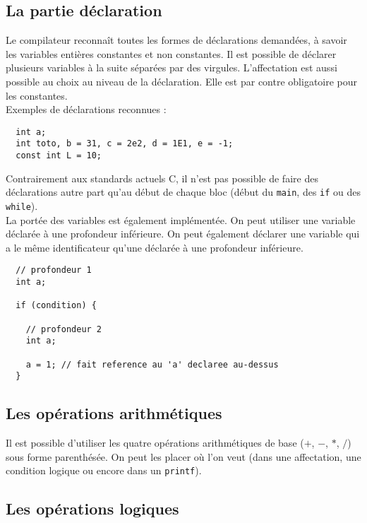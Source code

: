 \subsection{La partie déclaration}

Le compilateur reconnaît toutes les formes de déclarations demandées, à savoir les variables entières constantes et non constantes. Il est possible de déclarer plusieurs variables à la suite séparées par des virgules. L’affectation est aussi possible au choix au niveau de la déclaration. Elle est par contre obligatoire pour les constantes.\\

Exemples de déclarations reconnues :
\begin{verbatim}
  int a;
  int toto, b = 31, c = 2e2, d = 1E1, e = -1;
  const int L = 10;
\end{verbatim}

\vspace{10pt}

Contrairement aux standards actuels C, il n’est pas possible de faire des déclarations autre part qu’au début de chaque bloc (début du \texttt{main}, des \texttt{if} ou des \texttt{while}).\\
La portée des variables est également implémentée. On peut utiliser une variable déclarée à une profondeur inférieure. On peut également déclarer une variable qui a le même identificateur qu’une déclarée à une profondeur inférieure.

\begin{verbatim}
  // profondeur 1
  int a;
  
  if (condition) {
    
    // profondeur 2
    int a;
    
    a = 1; // fait reference au 'a' declaree au-dessus
  }
\end{verbatim}

\subsection{Les opérations arithmétiques}

Il est possible d'utiliser les quatre opérations arithmétiques de base ($+$, $-$, $*$, $/$) sous forme parenthésée. On peut les placer où l'on veut (dans une affectation, une condition logique ou encore dans un \texttt{printf}).

\subsection{Les opérations logiques}


